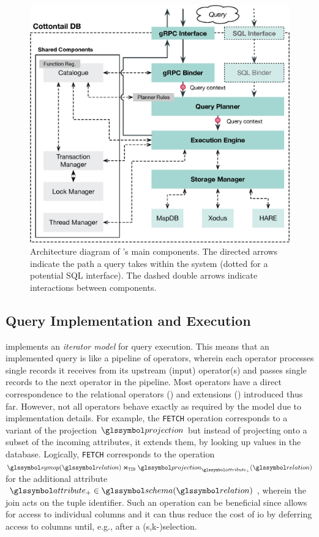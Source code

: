 \begin{figure}[bt]
    \centering
    \includegraphics[width=\textwidth]{figures/architecture.eps}
    \caption{Architecture diagram of \cottontail{}'s main components. The directed arrows indicate the path a query takes within the system (dotted for a potential SQL interface). The dashed double arrows indicate interactions between components.}
    \label{figure:cottontail_architecture}
\end{figure}


\subsection{Query Implementation and Execution}

\cottontail{} implements an \emph{iterator model} for query execution. This means that an implemented query is like a pipeline of operators, wherein each operator processes single records it receives from its upstream (input) operator(s) and passes single records to the next operator in the pipeline. Most operators have a direct correspondence to the relational operators () and extensions () introduced thus far. However, not all operators behave exactly as required by the model due to implementation details. For example, the \texttt{FETCH} operation corresponds to a variant of the projection $\projection$ but instead of projecting onto a subset of the incoming attributes, it extends them, by looking up values in the database. Logically, \texttt{FETCH} corresponds to the operation $\symop(\relation) \Join_{\mathtt{TID}} \projection_{\attribute_{+}}(\relation)$ for the additional attribute $\attribute_{+} \in \schema(\relation)$, wherein the join acts on the tuple identifier. Such an operation can be beneficial since \cottontail{} allows for access to individual columns and 
it can thus reduce the cost of \acrshort{io} by deferring access to columns until, e.g., after a (s,k-)selection.

